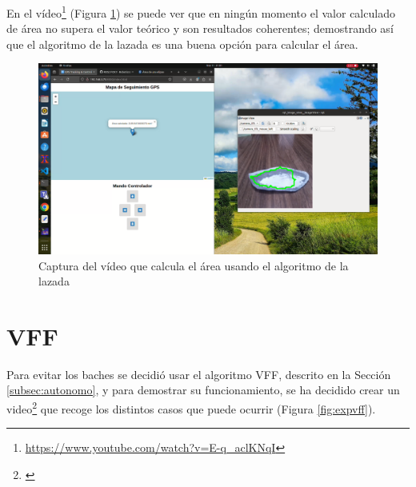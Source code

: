 En el vídeo\footnote{\url{https://www.youtube.com/watch?v=E-q_aclKNqI}} (Figura \ref{fig:expcapturalazada}) se puede ver que en ningún momento el valor calculado de área no supera el valor teórico y son resultados coherentes; demostrando así que el algoritmo de la lazada es una buena opción para calcular el área.
 
\begin{figure} [h!]
	\begin{center}
			\includegraphics[width=15cm]{figs/cap7/capturavideolazada.png}
		\end{center}
	\caption{Captura del vídeo que calcula el área usando el algoritmo de la lazada}
	\label{fig:expcapturalazada}
\end{figure}


\section{VFF}
\label{sec:expvff}
Para evitar los baches se decidió usar el algoritmo \ac{VFF}, descrito en la Sección \ref{subsec:autonomo}, y para demostrar su funcionamiento, se ha decidido crear un video\footnote{\url{}} que recoge los distintos casos que puede ocurrir (Figura \ref{fig:expvff}).  


